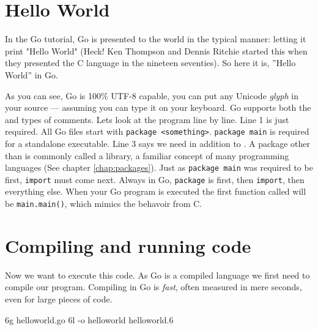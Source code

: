 \section{Hello World}
\label{sec:hello world}
In the Go tutorial, Go is presented to the world in the typical
manner: letting it print "Hello World" (Heck! Ken Thompson and
Dennis Ritchie started this when they presented the C language in 
the nineteen seventies).
So here it is, ''Hello World'' in Go.


As you can see, Go is 100\% UTF-8 capable, you can put any Unicode
\emph{glyph} in your source --- assuming you can type it on your keyboard.
Go supports both the \texttt{\rem{/* */}} and \texttt{\rem{//}} types of comments. 
Lets look at the program line by line.
Line 1 is just required.  All Go files start with \lstinline{package <something>}.
\lstinline{package main} is required for a standalone executable.  Line 3 says
we need  in addition to .  A package other than
 is commonly called a library, a familiar concept of many programming
languages (See chapter \ref{chap:packages}). 
Just as \lstinline{package main} was required to be first, 
\lstinline{import} must come next. Always in Go, \lstinline{package} is first, then
\lstinline{import}, then everything else.
When your Go program is executed the first function called will be
\lstinline{main.main()}, which mimics the behavoir from C.

\section{Compiling and running code}
Now we want to execute this code. As Go is a compiled language we first
need to compile our program. Compiling in Go is \emph{fast}, often
measured in mere seconds, even for large pieces of code.
\begin{display}
\pr 6g helloworld.go \qquad\qquad\qquad{}
\pr 6l -o helloworld helloworld.6 \qquad{}
\end{display}

